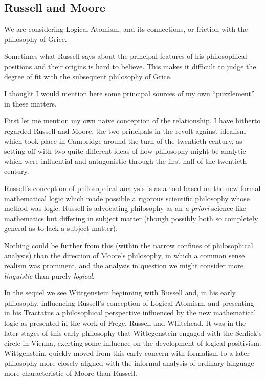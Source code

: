 \documentclass[10pt,titlepage]{article}
\begin{document}
\subsection{Russell and Moore}

We are considering Logical Atomism, and its connections, or friction with the philosophy of Grice.

Sometimes what Russell says about the principal features of his philosophical positions and their origins is hard to believe.
This makes it difficult to judge the degree of fit with the subsequent philosophy of Grice.

I thought I would mention here some principal sources of my own ``puzzlement'' in these matters.

First let me mention my own naive conception of the relationship.
I have hitherto regarded Russell and Moore, the two principals in the revolt against idealism which
took place in Cambridge around the turn of the twentieth century, as setting off with two quite different
ideas of how philosophy might be analytic which were influential and antagonistic through the first half
of the twentieth century.

Russell's conception of philosophical analysis is as a tool based on the new formal mathematical logic which made possible a rigorous scientific philosophy whose method was logic.
Russell is advocating philosophy as an {\it a priori} science like mathematics but differing in subject matter (though possibly both so completely general as to lack a subject matter).

Nothing could be further from this (within the narrow confines of philosophical analysis) than the direction of Moore's philosophy, in which a common sense realism was prominent, and the analysis in question we might consider more {\it linguistic} than purely {\it logical}.

In the sequel we see Wittgenstein beginning with Russell and, in his early philosophy, influencing Russell's conception of Logical Atomism, and presenting in his Tractatus a philosophical perspective influenced by the new mathematical logic as presented in the work of Frege, Russell and Whitehead.
It was in the later stages of this early philosophy that Wittegenstein engaged with the Schlick's circle in Vienna, exerting some influence on the development of logical positivism.
Wittgenstein, quickly moved from this early concern with formalism to a later philosophy more closely aligned with the informal analysis of ordinary language more characteristic of Moore than Russell.
\end{document}
